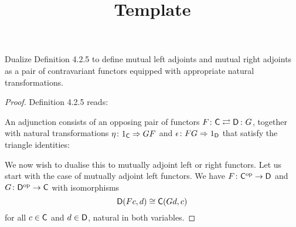 \documentclass[../../solutions]{subfiles}
\title{Template}
\author{}
\begin{document}
\maketitle

%

\begin{exercise}
  Dualize Definition 4.2.5 to define mutual left adjoints and mutual
  right adjoints as a pair of contravariant functors equipped with
  appropriate natural transformations.
\end{exercise}

\begin{proof}
  Definition 4.2.5 reads:
  \begingroup
  \renewcommand{\theHtheorem}{\theHsection.\arabic{theorem}.book}
  \begin{definition}
    An adjunction consists of an opposing pair of functors
    $\afunc{F}{G}{\sC}{\sD}$, together with natural transformations
    ${\eta}\colon{1_{\mathsf{C}}}\Rightarrow{GF}$ and ${\epsilon}\colon{FG}\Rightarrow{1_{\mathsf{D}}}$ that
    satisfy the triangle identities:
    \begin{center}
    \end{center}
  \end{definition}
  \popthm
  \endgroup

  We now wish to dualise this to mutually adjoint left or right
  functors.  Let us start with the case of mutually adjoint left
  functors.  We have ${F}\colon{{\mathsf{C}}^{\mathrm{op}}}\to{{\mathsf{D}}}$ and
  ${G}\colon{{\mathsf{D}}^{\mathrm{op}}}\to{{\mathsf{C}}}$ with isomorphisms
  $${\mathsf{D}}(Fc,d)\cong {\mathsf{C}}(Gd,c)$$
  for all $c\in{\mathsf{C}}$ and $d\in{\mathsf{D}}$, natural in both variables.


\end{proof}
\end{document}
